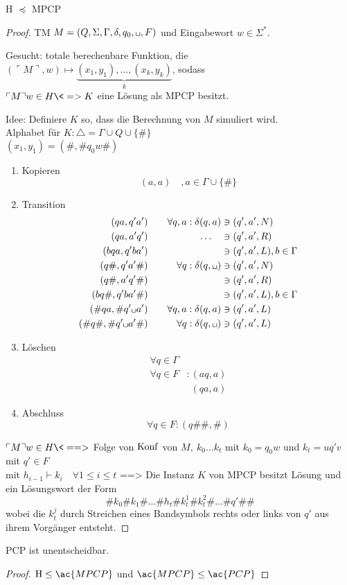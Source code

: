 \begin{lemma}[name={[H $\preceq$ \ac{MPCP}]}] 
	H $\preceq$ \ac{MPCP}
\end{lemma}
\begin{proof}
	\ac{TM} $M=(Q,\Sigma,\Gamma,\delta,q_0,\blank,F)$ und Eingabewort $w\in\Sigma^*$.
	
	Gesucht: totale berechenbare Funktion, die $(\ulcorner M \urcorner, w) \mapsto \underbrace{(x_1,y_1),\dots,(x_k,y_k)}_k$, sodass\\
	$\ulcorner M \urcorner w\in H \<=> K$ eine Lösung als \ac{MPCP} besitzt.
	
	Idee: Definiere $K$ so, dass die Berechnung von $M$ simuliert wird.\\
	Alphabet für $K: \triangle = \Gamma\cup Q\cup\{\#\}$\\
	$(x_1,y_1) = (\#,\#q_0w\#)$
	\begin{enumerate}
	\item Kopieren
		\[ (a,a)\quad, a\in\Gamma\cup\{\#\} \]
	\item Transition
		\begin{alignat*}{2}
			(qa,q'a') &\quad& \forall q,a:\delta(q,a) &\ni(q',a',N)\\
			(qa,a'q') && \dots\quad &\ni(q',a',R)\\
			(bqa,q'ba') &&  &\ni(q',a',L),b\in\Gamma\\
			(q\#,q'a'\#) && \forall q: \delta(q,\blank)&\ni(q',a',N)\\
			(q\#,a'q'\#) && &\ni(q',a',R)\\
			(bq\#,q'ba'\#) && &\ni(q',a',L),b\in\Gamma\\
			(\#qa,\#q'\blank a')&& \forall q,a:\delta(q,a) &\ni(q',a',L)\\
			(\#q\#,\#q'\blank a'\#)&& \forall q:\delta(q,\blank) &\ni(q',a',L)
		\end{alignat*}
	\item Löschen
		\begin{align*}
			\forall q\in \Gamma\\
			\forall q\in F &:(aq,a)\\
			&\phantom{{}:{}}(qa,a)
		\end{align*}
	\item Abschluss
		\[ \forall q\in F: (q\#\#,\#) \]
	\end{enumerate}
	$\ulcorner M \urcorner w\in H \<==>$ Folge von $\operatorname{Konf}$ von $M,\ k_0\dots k_t$ mit $k_0 =q_0w$ und $k_t = uq'v$ mit $q'\in F$\\
	mit $h_{i-1}\vdash k_i\quad \forall 1\leq i\leq t$
	\<==> Die Instanz $K$ von \ac{MPCP} besitzt Lösung und ein Lösungswort der Form
	\[ \#k_0\#k_1\# \dots \#h_t\#k_t^1\#k_t^2\# \dots \#q'\#\# \]
	wobei die $k_t^j$ durch Streichen eines Bandsymbols rechts oder links von $q'$ aus ihrem Vorgänger entsteht.
\end{proof}
\begin{Satz}[name={[\ac{PCP} ist unentscheidbar.]}]
	\ac{PCP} ist unentscheidbar.
\end{Satz}
\begin{proof}
	$\text{H}\leq\ac{MPCP}$ und $\ac{MPCP}\leq\ac{PCP}$
\end{proof}


